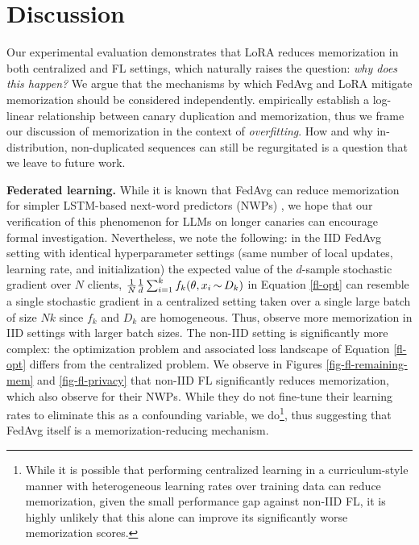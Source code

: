 \section{Discussion}
Our experimental evaluation demonstrates that LoRA reduces memorization in both centralized and FL settings, which naturally raises the question: \textit{why does this happen?} We argue that the mechanisms by which FedAvg and LoRA mitigate memorization should be considered independently. \citet{carlini2022quantifying} empirically establish a log-linear relationship between canary duplication and memorization, thus we frame our discussion of memorization in the context of \textit{overfitting}. How and why in-distribution, non-duplicated sequences can still be regurgitated \citep{carlini2019secret} is a question that we leave to future work.

\textbf{Federated learning.} While it is known that FedAvg can reduce memorization for simpler LSTM-based next-word predictors (NWPs) \citep{ramaswamy2020training, thakkar2020understanding}, we hope that our verification of this phenomenon for LLMs on longer canaries can encourage formal investigation. Nevertheless, we note the following: in the IID FedAvg setting with identical hyperparameter settings (same number of local updates, learning rate, and initialization) the expected value of the $d$-sample stochastic gradient over $N$ clients, $\frac{1}{N}\frac{1}{d}\sum_{i=1}^kf_k(\theta, x_i \hspace{-0.1em}\sim\hspace{-0.1em}D_k)$ in Equation \ref{fl-opt} can resemble a single stochastic gradient in a centralized setting taken over a single large batch of size $Nk$ since $f_k$ and $D_k$ are homogeneous. Thus, \citet{thakkar2020understanding} observe more memorization in IID settings with larger batch sizes. The non-IID setting is significantly more complex: the optimization problem and associated loss landscape of Equation \ref{fl-opt} differs from the centralized problem. We observe in Figures \ref{fig-fl-remaining-mem} and \ref{fig-fl-privacy} that non-IID FL significantly reduces memorization, which \citet{thakkar2020understanding} also observe for their NWPs. While they do not fine-tune their learning rates to eliminate this as a confounding variable, we do\footnote{While it is possible that performing centralized learning in a curriculum-style manner with heterogeneous learning rates over training data can reduce memorization, given the small performance gap against non-IID FL, it is highly unlikely that this alone can improve its significantly worse memorization scores.}, thus suggesting that FedAvg itself is a memorization-reducing mechanism.

